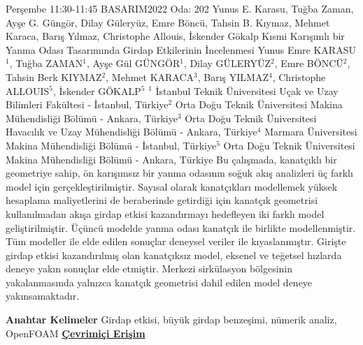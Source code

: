 
    \begin{abstract_basarim}
    {Perşembe 11:30-11:45}
    {BASARIM2022}
    {Oda: 202}
    {Yunus E. Karasu, Tuğba Zaman, Ayşe G. Güngör, Dilay Güleryüz, Emre Böncü, Tahsin B. Kıymaz, Mehmet Karaca, Barış Yılmaz, Christophe Allouis, İskender Gökalp}
    {Kısmi Karışımlı bir Yanma Odası Tasarımında Girdap Etkilerinin İncelenmesi}
    {%
    Yunus Emre KARASU$^{1}$, Tuğba ZAMAN$^{1}$, Ayşe Gül GÜNGÖR$^{1}$, Dilay GÜLERYÜZ$^{2}$, Emre BÖNCÜ$^{2}$, Tahsin Berk KIYMAZ$^{2}$, Mehmet KARACA$^{3}$, Barış YILMAZ$^{4}$, Christophe ALLOUIS$^{5}$, İskender GÖKALP$^{5}$}
    {%
    }
    {%
    $^1$ İstanbul Teknik Üniversitesi Uçak ve Uzay Bilimleri Fakültesi - İstanbul, Türkiye\newline{}$^2$ Orta Doğu Teknik Üniversitesi Makina Mühendisliği Bölümü - Ankara, Türkiye\newline{}$^3$ Orta Doğu Teknik Üniversitesi Havacılık ve Uzay Mühendisliği Bölümü - Ankara, Türkiye\newline{}$^4$ Marmara Üniversitesi Makina Mühendisliği Bölümü - İstanbul, Türkiye\newline{}$^5$ Orta Doğu Teknik Üniversitesi Makina Mühendisliği Bölümü - Ankara, Türkiye}
    Bu çalışmada, kanatçıklı bir geometriye sahip, ön karışımsız bir yanma odasının soğuk akış analizleri üç farklı model için gerçekleştirilmiştir. Sayısal olarak kanatçıkları modellemek yüksek hesaplama maliyetlerini de beraberinde getirdiği için kanatçık geometrisi kullanılmadan akışa girdap etkisi kazandırmayı hedefleyen iki farklı model geliştirilmiştir. Üçüncü modelde yanma odası kanatçık ile birlikte modellenmiştir. Tüm modeller ile elde edilen sonuçlar deneysel veriler ile kıyaslanmıştır. \newline Girişte girdap etkisi kazandırılmış olan kanatçıksız model, eksenel ve teğetsel hızlarda deneye yakın sonuçlar elde etmiştir. Merkezi sirkülasyon bölgesinin yakalanmasında yalnızca kanatçık geometrisi dahil edilen model deneye yakınsamaktadır. 
    
            \textbf{Anahtar Kelimeler} \newline{}Girdap etkisi, büyük girdap benzeşimi, nümerik analiz, OpenFOAM
     \newline\newline\noindent \href{https://drive.google.com/file/d/1_NHmqP-nsgg6rBB_t_cFZT5-596HZ185/view?usp=drivesdk}{\bfseries Çevrimiçi Erişim}
    \end{abstract_basarim}
    